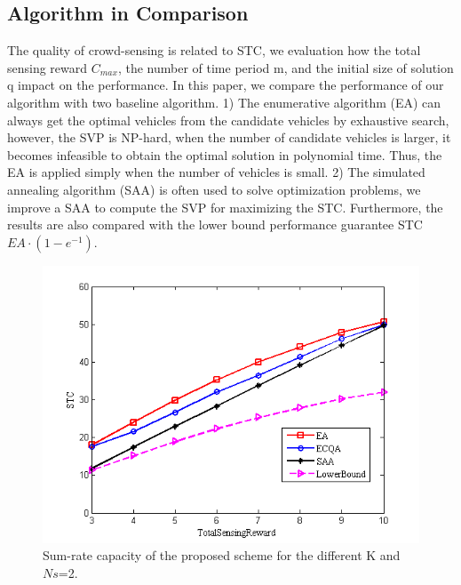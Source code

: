 \documentclass[journal]{IEEEtran}
\begin{document}
\subsection{Algorithm in Comparison}
The quality of crowd-sensing is related to STC, we evaluation how the total sensing reward $C_{max}$, the number of time period m, and the initial size of solution q impact on the performance. In this paper, we compare the performance of our algorithm with two baseline algorithm. 1) The enumerative algorithm (EA) can always get the optimal vehicles from the candidate vehicles by exhaustive search, however, the SVP is NP-hard, when the number of candidate vehicles is larger, it becomes infeasible to obtain the optimal solution in polynomial time. Thus, the EA is applied simply when the number of vehicles is small. 2) The simulated annealing algorithm (SAA) is often used to solve optimization problems, we improve a SAA to compute the SVP for maximizing the STC. Furthermore, the results are also compared with the lower bound performance guarantee STC $EA\cdot(1-e^{-1})$. 
\begin{figure}[t]
	\centering
	\includegraphics[width=1\linewidth]{Fig4(a).png}
	\caption{Sum-rate capacity of the proposed scheme for the different K and $ Ns $=2.}
	\label{fig:figure4}
\end{figure}
\end{document}

